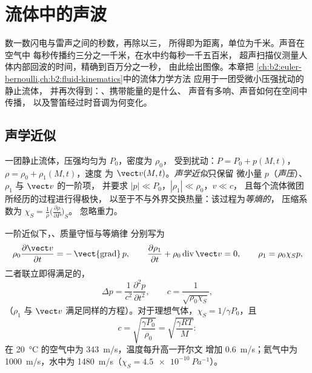 \chapter{流体中的声波}\label{ch:b2:sound-waves}

数一数闪电与雷声之间的秒数，再除以三，
所得即为距离，单位为千米。声音在空气中
每秒传播约三分之一千米，在水中约每秒一千五百米，
超声扫描仪测量人体内部回波的时间，精确到百万分之一秒，
由此绘出图像。本章把
\cref{ch:b2:euler-bernoulli,ch:b2:fluid-kinematics}中的流体力学方法
应用于一团受微小压强扰动的静止流体，
并再次得到：、携带能量的是什么、
声音有多响、声音如何在空间中传播，
以及警笛经过时音调为何变化。

\section{声学近似}

\begin{definition}[声学扰动]\label{def:b2:sound-waves:approximation}
一团静止流体，压强均匀为 $P_0$，密度为 $\rho_0$，
受到扰动：$P = P_0 + p(M, t)$，$\rho = \rho_0 + \rho_1(M, t)$，速度
为 $\vect v(M, t)$。\emph{声学近似}只保留
微小量 $p$（\emph{声压}）、$\rho_1$ 与 $\vect v$ 的一阶项，
并要求 $|p| \ll P_0$，$|\rho_1| \ll \rho_0$，$v \ll c$，
且每个流体微团所经历的过程进行得极快，
以至于不与外界交换热量：该过程为\emph{等熵的}，
压缩系数为 $\chi_S = \frac1\rho\bigl(\frac{\partial\rho}{\partial P}\bigr)_S$。
忽略重力。
\end{definition}

\begin{theorem}[声波]\label{thm:b2:sound-waves:equation}
一阶近似下，、质量守恒与等熵律
分别写为
\[
\rho_0\frac{\partial\vect v}{\partial t} = -\operatorname{\vect{grad}}p , \qquad
\frac{\partial\rho_1}{\partial t} + \rho_0\operatorname{div}\vect v = 0 , \qquad
\rho_1 = \rho_0\chi_Sp ,
\]
二者联立即得满足的，
\[
\Delta p = \frac1{c^2}\frac{\partial^2p}{\partial t^2} , \qquad
c = \frac1{\sqrt{\rho_0\chi_S}} ,
\]
（$\rho_1$ 与 $\vect v$ 满足同样的方程）。对于理想气体，$\chi_S =
1/\gamma P_0$，且
\[
c = \sqrt{\frac{\gamma P_0}{\rho_0}} = \sqrt{\frac{\gamma RT}{M}} :
\]
在 \qty{20}{\degreeCelsius} 的空气中为 \qty{343}{m/s}，温度每升高一开尔文
增加 \qty{0.6}{m/s}；氦气中为 \qty{1000}{m/s}，水中为 \qty{1480}{m/s}（$\chi_S =
\qty{4.5e-10}{Pa^{-1}}$）。
\end{theorem}

